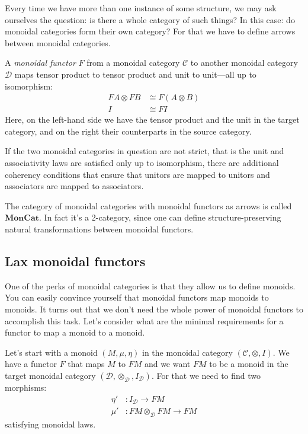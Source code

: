 \documentclass[DaoFP]{subfiles}
\begin{document}
Every time we have more than one instance of some structure, we may ask ourselves the question: is there a whole category of such things? In this case: do monoidal categories form their own category? For that we have to define arrows between monoidal categories.

A \emph{monoidal functor} $F$ from a monoidal category $\mathcal{C}$ to another monoidal category $\mathcal{D}$ maps tensor product to tensor product and unit to unit---all up to isomorphism:
\begin{align*}
F A \otimes F B &\cong F (A \otimes B) \\
I &\cong F I 
\end{align*}
Here, on the left-hand side we have the tensor product and the unit in the target category, and on the right their counterparts in the source category. 

If the two monoidal categories in question are not strict, that is the unit and associativity laws are satisfied only up to isomorphism, there are additional coherency conditions that ensure that unitors are mapped to unitors and associators are mapped to associators.

The category of monoidal categories with monoidal functors as arrows is called $\mathbf{MonCat}$. In fact it's a 2-category, since one can define structure-preserving natural transformations between monoidal functors.

\subsection{Lax monoidal functors}

One of the perks of monoidal categories is that they allow us to define monoids. You can easily convince yourself that monoidal functors map monoids to monoids. It turns out that we don't need the whole power of monoidal functors to accomplish this task. Let's consider what are the minimal requirements for a functor to map a monoid to a monoid. 

Let's start with a monoid $(M, \mu, \eta)$ in the monoidal category $(\mathcal{C}, \otimes, I)$. We have a functor $F$ that maps $M$ to $F M$ and we want $F M$ to be a monoid in the target monoidal category $(\mathcal{D}, \otimes_{\mathcal{D}}, I_{\mathcal{D}})$. For that we need to find two morphisms:
\begin{align*}
\eta' &\colon I_{\mathcal{D}} \to F M \\
 \mu' &\colon F M \otimes_{\mathcal{D}} F M \to F M 
\end{align*}
satisfying monoidal laws.
\end{document}
